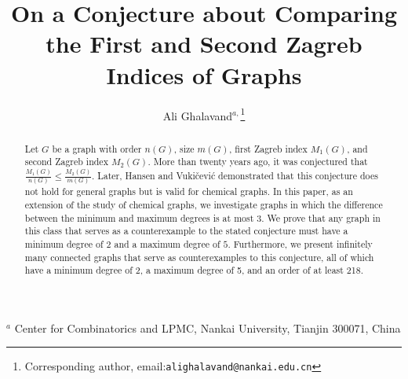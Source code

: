 \documentclass[12pt]{article}
\begin{document}
\title{On a Conjecture about Comparing the First and Second Zagreb Indices of Graphs}

\author{
Ali Ghalavand$^{a,}$\thanks{Corresponding author, email:\texttt{alighalavand@nankai.edu.cn}}}

\maketitle

\begin{center}
$^a$ Center for Combinatorics and LPMC, Nankai University, Tianjin 300071, China \\
\end{center}



\begin{abstract}
Let $G$ be a graph with order $n(G)$, size $m(G)$, first Zagreb index $M_1(G)$, and second Zagreb index $M_2(G)$. More than twenty years ago, it was conjectured that 
$\frac{M_1(G)}{n(G)} \leq \frac{M_2(G)}{m(G)}$. Later, Hansen and Vuki\v{c}evi\'c demonstrated that this conjecture does not hold for general graphs but is valid for chemical graphs. In this paper, as an extension of the study of chemical graphs, we investigate graphs in which the difference between the minimum and maximum degrees is at most $3$. We prove that any graph in this class that serves as a counterexample to the stated conjecture must have a minimum degree of $2$ and a maximum degree of $5$. Furthermore, we present infinitely many connected graphs that serve as counterexamples to this conjecture, all of which have a minimum degree of 2, a maximum degree of 5, and an order of at least 218.
\end{abstract}
\end{document}
